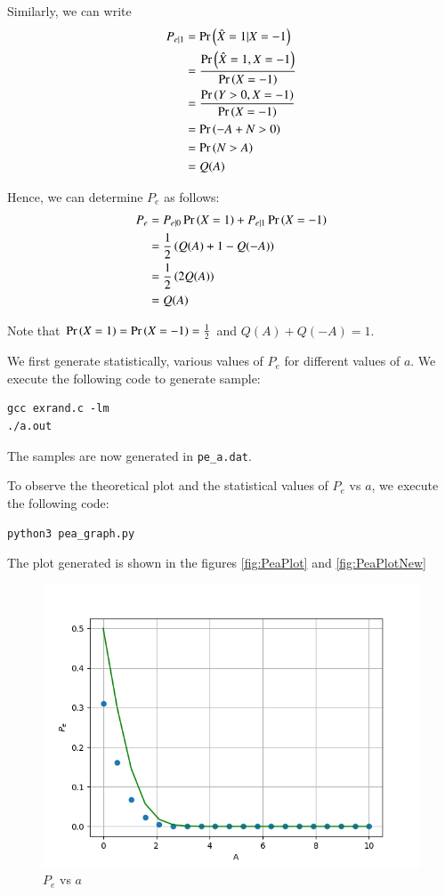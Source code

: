 \documentclass[journal,12pt,twocolumn]{IEEEtran}
\renewcommand\thesection{\arabic{section}}
\begin{document}
\begin{enumerate}[label=\thesection.\arabic*
,ref=\thesection.\theenumi]
	Similarly, we can write
	\begin{align}
		P_{e|1} &= \Pr\left(\hat{X} = 1|X = -1\right) \\
		&= \frac{\Pr\left(\hat{X} = 1, X = -1\right)}{\Pr\left(X = -1\right)} \\
		&= \frac{\Pr\left(Y > 0, X = -1\right)}{\Pr\left(X = -1\right)} \\
		&= \Pr\left(-A + N > 0\right) \\
		&= \Pr\left(N > A\right) \\
		&= Q(A)
		\label{eq:PE1}
	\end{align}
	
	Hence, we can determine $P_e$ as follows:
	\begin{align}
		P_e &= P_{e|0} \Pr\left(X = 1\right) + P_{e|1} \Pr\left(X = -1\right) \\
		&= \frac{1}{2}\left( Q(A) + 1 - Q(-A) \right) \\
		&= \frac{1}{2}\left( 2Q(A) \right) \\
		&= Q(A)
		\label{eq:PE}
	\end{align}

	Note that $\Pr\left(X = 1\right) = \Pr\left(X = -1\right) = \frac{1}{2}$ and $Q(A) + Q(-A) = 1$.
	
	We first generate statistically, various values of $P_e$ for different values of $a$. We execute the following code to generate sample:
	\begin{lstlisting}
gcc exrand.c -lm
./a.out
	\end{lstlisting}
	The samples are now generated in \verb|pe_a.dat|.
	
	To observe the theoretical plot and the statistical values of $P_e$ vs $a$, we execute the following code:
	\begin{lstlisting}
python3 pea_graph.py
	\end{lstlisting}

	The plot generated is shown in the figures \eqref{fig:PeaPlot} and \eqref{fig:PeaPlotNew}
	\begin{figure}
	\centering
	\includegraphics[width=\columnwidth]{../figs/pea_plot.png}
	\caption{$P_e$ vs $a$}
	\label{fig:PeaPlot}
	\end{figure}
	

\end{enumerate}
\end{document}
